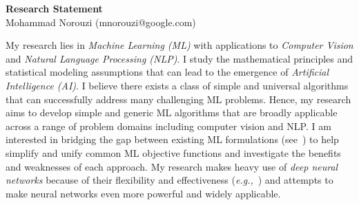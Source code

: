 \documentclass[a4paper, 10pt]{article}
\def\eg{{\em e.g.,}}
\begin{document}
\thispagestyle{fancy}
\lhead{}
\rhead{}
\renewcommand{\headrulewidth}{0pt} 
\renewcommand{\footrulewidth}{0pt} 


\pagestyle{fancy}
\lhead{\textcolor{gray}{\it Mohammad Norouzi}}
\rhead{\textcolor{gray}{\thepage/\totalpages{}}}


\begin{center}
{\LARGE \bf Research Statement}\\
\vspace*{0.1cm}
{\normalsize Mohammad Norouzi (mnorouzi@google.com)}
\vspace*{0.2cm}
\end{center}




My research lies in {\em Machine Learning (ML)} with applications
to {\em Computer Vision} and {\em Natural Language Processing
  (NLP)}. I study the mathematical principles and statistical modeling
assumptions that can lead to the emergence of {\em Artificial
  Intelligence (AI)}.  I believe there exists a class of simple and
universal algorithms that can successfully address many challenging ML
problems. Hence, my research aims to develop simple and generic ML
algorithms that are broadly applicable across a range of problem
domains including computer vision and NLP. I am interested in bridging
the gap between existing ML formulations (see~\cite{raml,pcl}) to
help simplify and unify common ML objective functions and investigate
the benefits and weaknesses of each approach. My research makes heavy
use of {\em deep neural networks} because of their flexibility and
effectiveness (\eg~\cite{seq2seq,alphago}) and attempts to make neural
networks even more powerful and widely applicable.
\end{document}
